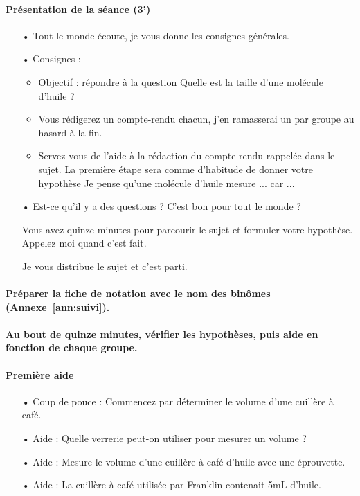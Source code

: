 \documentclass[12pt,a4paper]{article}
\begin{document}
\paragraph{Présentation de la séance (3')}
\begin{itemize}
\item[•]  \og Tout le monde écoute, je vous donne les consignes générales.\fg{}

\item[•] Consignes :
\begin{itemize}
\item Objectif : répondre à la question \og Quelle est la taille d'une molécule d'huile ? \fg{}
\item \og Vous rédigerez un compte-rendu chacun, j'en ramasserai un par groupe au hasard à la fin. \fg{}
\item \og Servez-vous de l'aide à la rédaction du compte-rendu rappelée dans le sujet.
La première étape sera comme d'habitude de donner votre hypothèse \og Je pense qu'une molécule d'huile mesure ... car ... \fg{}
\end{itemize}

\item[•] \og Est-ce qu'il y a des questions ?
C'est bon pour tout le monde ?

Vous avez quinze minutes pour parcourir le sujet et formuler votre hypothèse.
Appelez moi quand c'est fait.

Je vous distribue le sujet et c'est parti.
\fg{}
\end{itemize}

\paragraph{Préparer la fiche de notation avec le nom des binômes (Annexe~\ref{ann:suivi}).}

\paragraph{Au bout de quinze minutes, vérifier les hypothèses, puis aide en fonction de chaque groupe.}

\paragraph{Première aide}
\begin{itemize}
\item[•] Coup de pouce : Commencez par déterminer le volume d'une cuillère à café.
\item[•] Aide : Quelle verrerie peut-on utiliser pour mesurer un volume ?
\item[•] Aide : Mesure le volume d'une cuillère à café d'huile avec une éprouvette.
\item[•] Aide : La cuillère à café utilisée par Franklin contenait \unit{5}{mL} d'huile.
\end{itemize}
\end{document}
